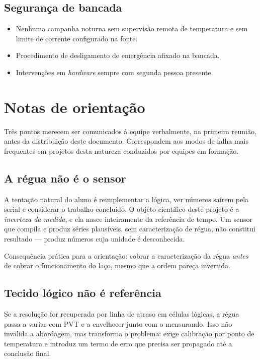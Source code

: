 \documentclass[11pt,a4paper]{article}
\begin{document}
\subsection{Segurança de bancada}

\begin{itemize}
  \item Nenhuma campanha noturna sem supervisão remota de temperatura e sem limite
        de corrente configurado na fonte.
  \item Procedimento de desligamento de emergência afixado na bancada.
  \item Intervenções em \emph{hardware} sempre com segunda pessoa presente.
\end{itemize}

\section{Notas de orientação}

Três pontos merecem ser comunicados à equipe verbalmente, na primeira reunião, antes
da distribuição deste documento. Correspondem aos modos de falha mais frequentes em
projetos desta natureza conduzidos por equipes em formação.

\subsection{A régua não é o sensor}

A tentação natural do aluno é reimplementar a lógica, ver números saírem pela serial e
considerar o trabalho concluído. O objeto científico deste projeto é a \emph{incerteza
da medida}, e ela nasce inteiramente da referência de tempo. Um sensor que compila e
produz séries plausíveis, sem caracterização de régua, não constitui resultado ---
produz números cuja unidade é desconhecida.

Consequência prática para a orientação: cobrar a caracterização da régua \emph{antes}
de cobrar o funcionamento do laço, mesmo que a ordem pareça invertida.

\subsection{Tecido lógico não é referência}

Se a resolução for recuperada por linha de atraso em células lógicas, a régua passa a
variar com PVT e a envelhecer junto com o mensurando. Isso não invalida a abordagem,
mas transforma o problema: exige calibração por ponto de temperatura e introduz um
termo de erro que precisa ser propagado até a conclusão final.
\end{document}
